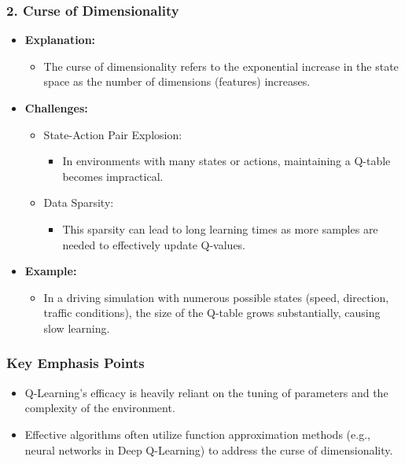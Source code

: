 \documentclass{beamer}
\begin{document}
\begin{frame}[fragile]
    \frametitle{2. Curse of Dimensionality}
    \begin{itemize}
        \item \textbf{Explanation:}
        \begin{itemize}
            \item The curse of dimensionality refers to the exponential increase in the state space as the number of dimensions (features) increases.
        \end{itemize}
        \item \textbf{Challenges:}
        \begin{itemize}
            \item State-Action Pair Explosion:
            \begin{itemize}
                \item In environments with many states or actions, maintaining a Q-table becomes impractical.
            \end{itemize}
            \item Data Sparsity:
            \begin{itemize}
                \item This sparsity can lead to long learning times as more samples are needed to effectively update Q-values.
            \end{itemize}
        \end{itemize}
        \item \textbf{Example:}
        \begin{itemize}
            \item In a driving simulation with numerous possible states (speed, direction, traffic conditions), the size of the Q-table grows substantially, causing slow learning.
        \end{itemize}
    \end{itemize}
\end{frame}

\begin{frame}[fragile]
    \frametitle{Key Emphasis Points}
    \begin{itemize}
        \item Q-Learning's efficacy is heavily reliant on the tuning of parameters and the complexity of the environment.
        \item Effective algorithms often utilize function approximation methods (e.g., neural networks in Deep Q-Learning) to address the curse of dimensionality.
    \end{itemize}
\end{frame}
\end{document}
